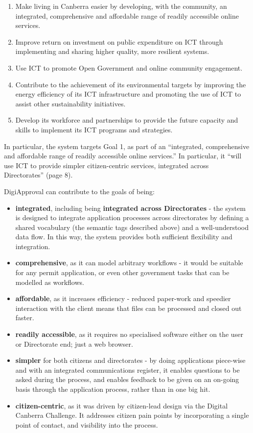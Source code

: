 \documentclass[12pt,a4paper,twosided]{article}
\begin{document}
\begin{enumerate}
\item
  Make living in Canberra easier by developing, with the community, an
  integrated, comprehensive and affordable range of readily accessible
  online services.
\item
  Improve return on investment on public expenditure on ICT through
  implementing and sharing higher quality, more resilient systems.
\item
  Use ICT to promote Open Government and online community engagement.
\item
  Contribute to the achievement of its environmental targets by
  improving the energy efficiency of its ICT infrastructure and
  promoting the use of ICT to assist other sustainability initiatives.
\item
  Develop its workforce and partnerships to provide the future capacity
  and skills to implement its ICT programs and strategies.
\end{enumerate}

In particular, the system targets Goal 1, as part of an ``integrated,
comprehensive and affordable range of readily accessible online
services.'' In particular, it ``will use ICT to provide simpler
citizen-centric services, integrated across Directorates'' (page 8).

DigiApproval can contribute to the goals of being:

\begin{itemize}

\item
  \textbf{integrated}, including being \textbf{integrated across
  Directorates} - the system is designed to integrate application
  processes across directorates by defining a shared vocabulary (the
  semantic tags described above) and a well-understood data flow. In
  this way, the system provides both sufficient flexibility and
  integration.
\item
  \textbf{comprehensive}, as it can model arbitrary workflows - it would
  be suitable for any permit application, or even other government tasks
  that can be modelled as workflows.
\item
  \textbf{affordable}, as it increases efficiency - reduced paper-work
  and speedier interaction with the client means that files can be
  processed and closed out faster.
\item
  \textbf{readily accessible}, as it requires no specialised software
  either on the user or Directorate end; just a web browser.
\item
  \textbf{simpler} for both citizens and directorates - by doing
  applications piece-wise and with an integrated communications
  register, it enables questions to be asked during the process, and
  enables feedback to be given on an on-going basis through the
  application process, rather than in one big hit.
\item
  \textbf{citizen-centric}, as it was driven by citizen-lead design via
  the Digital Canberra Challenge. It addresses citizen pain points by
  incorporating a single point of contact, and visibility into the
  process.
\end{itemize}
\end{document}
